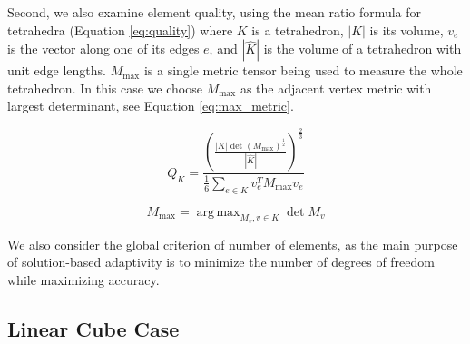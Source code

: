 \documentclass[3p,times,procedia,number]{elsarticle}
\DeclareMathOperator*{\argmax}{arg\,max}
\begin{document}
Second, we also examine element quality, using the
mean ratio formula for tetrahedra (Equation \ref{eq:quality})
where $K$ is a tetrahedron, $|K|$ is its volume,
$v_e$ is the vector along one of its edges $e$,
and $|\hat{K}|$ is the volume of a tetrahedron
with unit edge lengths.
$M_{\text{max}}$ is a single metric tensor
being used to measure the whole tetrahedron.
In this case we choose $M_{\text{max}}$ as the
adjacent vertex metric with largest determinant,
see Equation \ref{eq:max_metric}.

\begin{equation}
\label{eq:quality}
Q_K =
 \frac{\left(\frac{|K|\det(M_{\text{max}})^{\frac12}}
                  {|\hat{K}|}
       \right)^{\frac{2}{3}}}
      {\frac16\sum_{e\in K}{v_e^T M_{\text{max}} v_e}}
\end{equation}

\begin{equation}
\label{eq:max_metric}
M_{\text{max}} = \argmax_{M_v, v\in K}{\det{M_v}}
\end{equation}

We also consider the global criterion of number of elements,
as the main purpose of solution-based adaptivity is to
minimize the number of degrees of freedom while maximizing
accuracy.

\subsection{Linear Cube Case}
\end{document}
